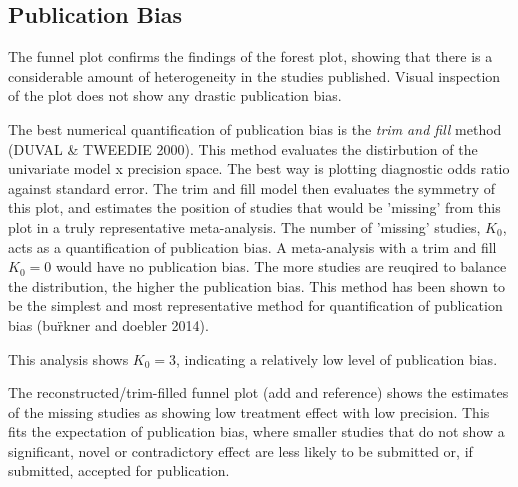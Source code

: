 \subsection{Publication Bias}

The funnel plot confirms the findings of the forest plot, showing that there is a considerable amount of heterogeneity in the studies published.
Visual inspection of the plot does not show any drastic publication bias.

The best numerical quantification of publication bias is the \emph{trim and fill} method (DUVAL \& TWEEDIE 2000).
This method evaluates the distirbution of the univariate model x precision space.
The best way is plotting diagnostic odds ratio against standard error.
The trim and fill model then evaluates the symmetry of this plot, and estimates the position of studies that would be 'missing' from this plot in a truly representative meta-analysis.
The number of 'missing' studies, $K_0$, acts as a quantification of publication bias.
A meta-analysis with a trim and fill $K_0 = 0$ would have no publication bias.
The more studies are reuqired to balance the distribution, the higher the publication bias.
This method has been shown to be the simplest and most representative method for quantification of publication bias (bu\"rkner and doebler 2014).


This analysis shows $K_0 = 3$, indicating a relatively low level of publication bias.

The reconstructed/trim-filled funnel plot (add and reference) shows the estimates of the missing studies as showing low treatment effect with low precision.
This fits the expectation of publication bias, where smaller studies that do not show a significant, novel or contradictory effect are less likely to be submitted or, if submitted, accepted for publication.
